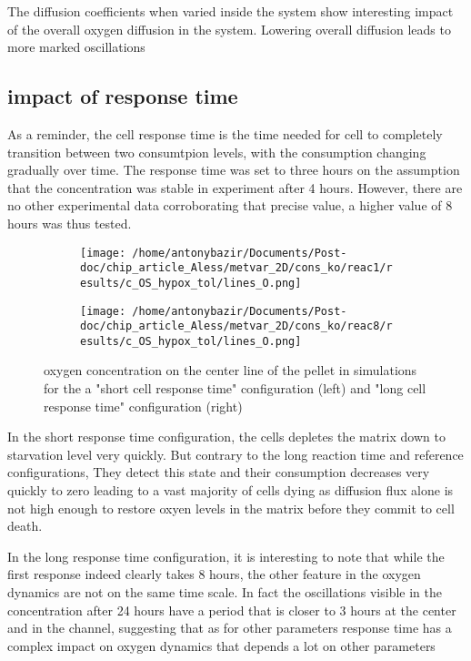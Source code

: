 \documentclass[11pt,a4paper]{article}
\begin{document}
The diffusion coefficients when varied inside the system show interesting impact of the overall oxygen diffusion in the system. Lowering overall diffusion leads to more marked oscillations

\subsection{impact of response time}
As a reminder, the cell response time is the time needed for cell to completely transition between two consumtpion levels, with the consumption changing gradually over time. The response time was set to three hours on the assumption that the concentration was stable in experiment after 4 hours. However, there are no other experimental data corroborating that precise value, a higher value of 8 hours was thus tested.

\begin{figure}[ht!]
\begin{subfigure}{0.44\textwidth}
	\centering
	\texttt{[image: /home/antonybazir/Documents/Post-doc/chip\_article\_Aless/metvar\_2D/cons\_ko/reac1/results/c\_OS\_hypox\_tol/lines\_O.png]}
\end{subfigure}
\begin{subfigure}{0.44\textwidth}
	\centering
	\texttt{[image: /home/antonybazir/Documents/Post-doc/chip\_article\_Aless/metvar\_2D/cons\_ko/reac8/results/c\_OS\_hypox\_tol/lines\_O.png]}
\end{subfigure}
\caption{oxygen concentration on the center line of the pellet in simulations for the a "short cell response time" configuration (left) and "long cell response time" configuration (right)  \label{reac_map}}
\end{figure}

In the short response time configuration, the cells depletes the matrix down to starvation level very quickly. But contrary to the long reaction time  and reference configurations, They detect this state and their consumption decreases very quickly to zero leading to a vast majority of cells dying as diffusion flux alone is not high enough to restore oxyen levels in the matrix before they commit to cell death.

In the long response time configuration, it is interesting to note that while the first response indeed clearly takes 8 hours, the other feature in the oxygen dynamics are not on the same time scale. In fact the oscillations visible in the concentration after 24 hours have a period that is closer to 3 hours at the center and in the channel, suggesting that as for other parameters response time has a complex impact on oxygen dynamics that depends a lot on other parameters
\end{document}
